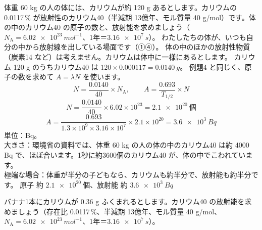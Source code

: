 \label{ph:原-12:ex5}
\begin{phreidai}[体の中のカリウム40]
体重 60 kg の人の体には、カリウムが約 120 g あるとします。カリウムの 0.0117\,\% が放射性のカリウム40（半減期 13億年、モル質量 40 g/mol）です。体の中のカリウム40 の原子の数と、放射能を求めましょう（$N_{\mathrm A}=\qty{6.02e23}{mol^{-1}}$、1年＝$\qty{3.16e7}{s}$）。
\phbamen
わたしたちの体が、いつも自分の中から放射線を出している場面です（①④）。
\phmushi
体の中のほかの放射性物質（炭素14 など）は考えません。カリウムは体中に一様にあるとします。
\phzu
カリウム 120 g のうちカリウム40 は $120\times0.000117=\qty{0.0140}{g}$。
\phriyu
例題4 と同じく、原子の数を求めて $A=\lambda N$ を使います。
\phtateru
\[ N=\frac{0.0140}{40}\times N_{\mathrm A},\qquad A=\frac{0.693}{T_{1/2}}\times N \]
\phtoku
\[ N=\frac{0.0140}{40}\times6.02\times10^{23}=\qty{2.1e20}{個} \]
\[ A=\frac{0.693}{1.3\times10^9\times3.16\times10^7}\times2.1\times10^{20}=\qty{3.6e3}{Bq} \]
\phtashikame
単位：Bq。\\
大きさ：環境省の資料では、体重 60 kg の人の体の中のカリウム40 は約 4000 Bq で、ほぼ合います。1秒に約3600個のカリウム40 が、体の中でこわれています。\\
極端な場合：体重が半分の子どもなら、カリウムも約半分で、放射能も約半分です。
\kotae 原子 約 $\qty{2.1e20}{個}$、放射能 約 $\qty{3.6e3}{Bq}$
\end{phreidai}
\begin{jibun}
バナナ1本にカリウムが 0.36 g ふくまれるとします。カリウム40 の放射能を求めましょう（存在比 0.0117\,\%、半減期 13億年、モル質量 40 g/mol、$N_{\mathrm A}=\qty{6.02e23}{mol^{-1}}$、1年＝$\qty{3.16e7}{s}$）。
\end{jibun}

